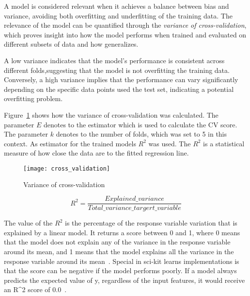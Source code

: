A model is considered relevant when it achieves a balance between bias and
variance, avoiding both overfitting and underfitting of the training data.
The relevance of the model can be quantified through the \textit{variance of
cross-validation}, which proves insight into how the model performs when trained and
evaluated on different subsets of data and how generalizes.

A low variance indicates that the model's performance is consistent across
different folds,suggesting that the model is not overfitting the training data.
Conversely, a high variance implies that the performance can vary significantly
depending on the specific data points used the test set, indicating a potential
overfitting problem.

Figure~\ref{fig:variance-of-cv} shows how the variance of cross-validation
was calculated.
The parameter \(E\) denotes to the estimator which is used to calculate the
\ac{CV} score.
The parameter \(k\) denotes to the number of folds, which was set to 5 in this
context.
As estimator for the trained models \(R^2\) was used.
The \(R^2\) is a statistical measure of how close the data are to the fitted regression
line.

\begin{figure}[h]
    \begin{tcolorbox}[arc=0pt,boxrule=0.5pt]
        \centering
        \texttt{[image: cross\_validation]}
        \caption{Variance of cross-validation}
        \label{fig:variance-of-cv}
    \end{tcolorbox}
\end{figure}

\begin{equation}
    \label{eq:r2}
    R^2 = \frac{Explained\_variance}{Total\_variance\_targert\_variable}
\end{equation}

The value of the \(R^2\) is the percentage of the response variable variation that is
explained by a linear model.
It returns a score between 0 and 1, where 0 means that the model does not
explain any of the variance in the response variable around its mean, and 1 means that
the model explains all the variance in the response variable around its mean~\cite[p.
43]{muller_introductionmachinelearning_2016}.
Special in sci-kit learns implementations is that the score can be negative if the model
performs poorly. If a model always predicts the expected value of y, regardless of the
input features, it would receive an R^2 score of 0.0~\cite{_sklearnmetricsr2_}.

